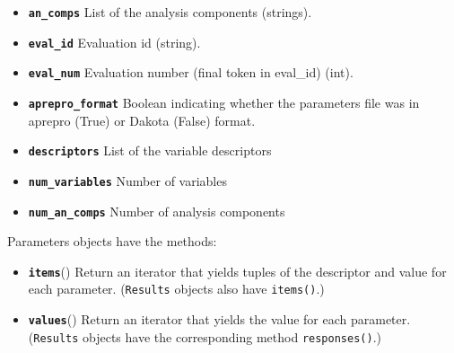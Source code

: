 \begin{itemize}

  \item{} \label{index:dakota.interfacing.Parameters.an_comps}\textbf{\texttt{an\_comps}} List of the analysis components (strings).

  \item{} \label{index:dakota.interfacing.Parameters.eval_id}\textbf{\texttt{eval\_id}} Evaluation id (string).

  \item{} \label{index:dakota.interfacing.Parameters.eval_num}\textbf{\texttt{eval\_num}} Evaluation number (final token in eval\_id) (int).


  \item{} \label{index:dakota.interfacing.Parameters.aprepro_format}\textbf{\texttt{aprepro\_format}} Boolean indicating whether the parameters file was in aprepro (True) or Dakota (False) format.

  \item{}\label{index:dakota.interfacing.Parameters.descriptors}\textbf{\texttt{descriptors}} List of the variable descriptors

  \item{} \label{index:dakota.interfacing.Parameters.num_variables}\textbf{\texttt{num\_variables}} Number of variables

  \item{}\label{index:dakota.interfacing.Parameters.num_an_comps}\textbf{\texttt{num\_an\_comps}} Number of analysis components

\end{itemize}

Parameters objects have the methods:

\begin{itemize}
  \item{}
	  \label{index:dakota.interfacing.Parameters.items}\textbf{\texttt{items}}{()}{}
          Return an iterator that yields tuples of the descriptor and value for each parameter. ({\tt Results} objects also have {\tt items()}.)

  \item{}
	  \label{index:dakota.interfacing.Parameters.values}\textbf{\texttt{values}}{()}{}
          Return an iterator that yields the value for each parameter. ({\tt Results} objects have the corresponding method {\tt responses()}.)

\end{itemize}

